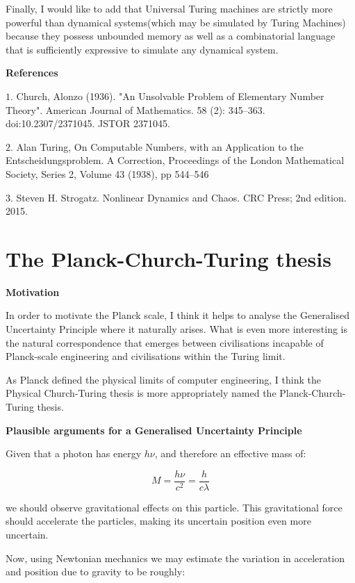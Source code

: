 \documentclass{article}
\begin{document}
Finally, I would like to add that Universal Turing machines are strictly more powerful than dynamical systems(which may be simulated by Turing Machines) because they possess unbounded memory as well as a combinatorial language that is sufficiently expressive to simulate any dynamical system.

\textbf{References}

$1.$ Church, Alonzo (1936). "An Unsolvable Problem of Elementary Number Theory". American Journal of Mathematics. 58 (2): 345–363. doi:10.2307/2371045. JSTOR 2371045.

$2.$ Alan Turing, On Computable Numbers, with an Application to the Entscheidungsproblem. A Correction, Proceedings of the London Mathematical Society, Series 2, Volume 43 (1938), pp 544–546

$3.$ Steven H. Strogatz. Nonlinear Dynamics and Chaos. CRC Press; 2nd edition. 2015.

\newpage 

\section{The Planck-Church-Turing thesis}

\textbf{Motivation}

In order to motivate the Planck scale, I think it helps to analyse the Generalised Uncertainty Principle where it naturally arises. What is even more interesting is the natural correspondence that emerges between civilisations incapable of Planck-scale engineering and civilisations within the Turing limit.

As Planck defined the physical limits of computer engineering, I think the Physical Church-Turing thesis is more appropriately named the Planck-Church-Turing thesis.

\textbf{Plausible arguments for a Generalised Uncertainty Principle}

Given that a photon has energy $h \nu$, and therefore an effective mass of:

\begin{equation}
M = \frac{h \nu}{c^2} = \frac{h}{c \lambda}
\end{equation}

we should observe gravitational effects on this particle. This gravitational force should accelerate the particles, making its uncertain position even more uncertain.

Now, using Newtonian mechanics we may estimate the variation in acceleration and position due to gravity to be roughly:
\end{document}
